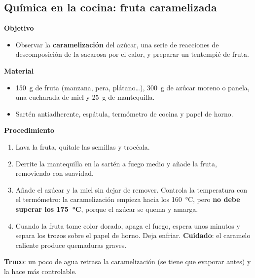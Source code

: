 \subsection{Química en la cocina: fruta caramelizada}

\noindent\begin{minipage}[t]{0.48\textwidth}
    \textbf{Objetivo}
    \begin{itemize}
        \item Observar la \textbf{caramelización} del azúcar, una serie de reacciones de descomposición de la sacarosa por el calor, y
        preparar un tentempié de fruta.
    \end{itemize}
\end{minipage}\hfill
\begin{minipage}[t]{0.48\textwidth}
    \textbf{Material}
    \begin{itemize}
        \item \qty{150}{\gram} de fruta (manzana, pera, plátano\ldots), \qty{300}{\gram} de azúcar moreno o panela, una cucharada de
        miel y \qty{25}{\gram} de mantequilla.
        \item Sartén antiadherente, espátula, termómetro de cocina y papel de horno.
    \end{itemize}
\end{minipage}

\textbf{Procedimiento}
\begin{enumerate}[label=\numberballgreen]
    \item Lava la fruta, quítale las semillas y trocéala.
    \item Derrite la mantequilla en la sartén a fuego medio y añade la fruta, removiendo con suavidad.
    \item Añade el azúcar y la miel sin dejar de remover. Controla la temperatura con el termómetro: la caramelización empieza
    hacia los \qty{160}{\degreeCelsius}, pero \textbf{no debe superar los \qty{175}{\degreeCelsius}}, porque el azúcar se quema y
    amarga.
    \item Cuando la fruta tome color dorado, apaga el fuego, espera unos minutos y separa los trozos sobre el papel de horno. Deja
    enfriar. \textbf{Cuidado}: el caramelo caliente produce quemaduras graves.
\end{enumerate}
\textbf{Truco}: un poco de agua retrasa la caramelización (se tiene que evaporar antes) y la hace más controlable.

